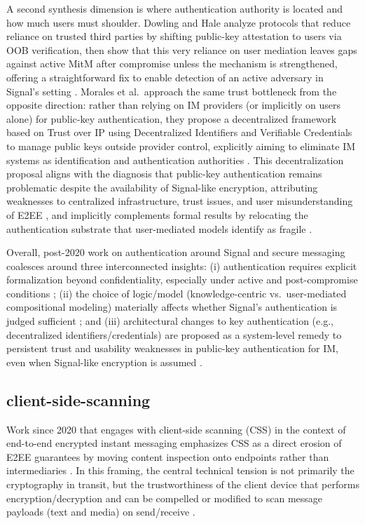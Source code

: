 A second synthesis dimension is where authentication authority is located and how much users must shoulder. Dowling and Hale analyze protocols that reduce reliance on trusted third parties by shifting public-key attestation to users via OOB verification, then show that this very reliance on user mediation leaves gaps against active MitM after compromise unless the mechanism is strengthened, offering a straightforward fix to enable detection of an active adversary in Signal’s setting \cite{dowling2021}. Morales et al.\ approach the same trust bottleneck from the opposite direction: rather than relying on IM providers (or implicitly on users alone) for public-key authentication, they propose a decentralized framework based on Trust over IP using Decentralized Identifiers and Verifiable Credentials to manage public keys outside provider control, explicitly aiming to eliminate IM systems as identification and authentication authorities \cite{morales2024}. This decentralization proposal aligns with the diagnosis that public-key authentication remains problematic despite the availability of Signal-like encryption, attributing weaknesses to centralized infrastructure, trust issues, and user misunderstanding of E2EE \cite{morales2024}, and implicitly complements formal results by relocating the authentication substrate that user-mediated models identify as fragile \cite{dowling2021}.

Overall, post-2020 work on authentication around Signal and secure messaging coalesces around three interconnected insights: (i) authentication requires explicit formalization beyond confidentiality, especially under active and post-compromise conditions \cite{dowling2021}; (ii) the choice of logic/model (knowledge-centric vs.\ user-mediated compositional modeling) materially affects whether Signal’s authentication is judged sufficient \cite{kamkuemah2021,dowling2021}; and (iii) architectural changes to key authentication (e.g., decentralized identifiers/credentials) are proposed as a system-level remedy to persistent trust and usability weaknesses in public-key authentication for IM, even when Signal-like encryption is assumed \cite{morales2024}.

\subsection{client-side-scanning}

Work since 2020 that engages with client-side scanning (CSS) in the context of end-to-end encrypted instant messaging emphasizes CSS as a direct erosion of E2EE guarantees by moving content inspection onto endpoints rather than intermediaries \cite{alsop2025}. In this framing, the central technical tension is not primarily the cryptography in transit, but the trustworthiness of the client device that performs encryption/decryption and can be compelled or modified to scan message payloads (text and media) on send/receive \cite{alsop2025}. 

